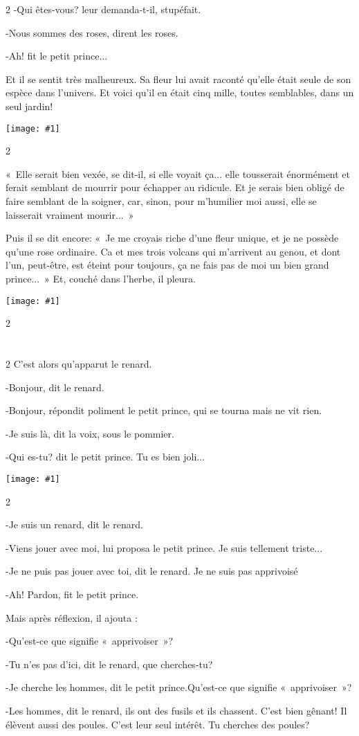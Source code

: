 \documentclass{report}
\newcommand{\parachapter}[2][]{\end{paracol}\chapter[#1]{#2}\begin{paracol}{2}}
\newcommand{\incpic}[1]{%
\end{paracol}
\begin{center}
    \texttt{[image: \#1]}
\end{center}
\begin{paracol}{2}}
\begin{document}
\begin{paracol}{2}
-Qui êtes-vous? leur demanda-t-il, stupéfait.

-Nous sommes des roses, dirent les roses.

-Ah! fit le petit prince...

Et il se sentit très malheureux. Sa fleur lui avait raconté qu'elle était seule de son espèce dans l'univers. Et voici qu'il en était cinq mille, toutes semblables, dans un seul jardin!

\incpic{pic/image36.jpeg}

«~Elle serait bien vexée, se dit-il, si elle voyait ça... elle tousserait énormément et ferait semblant de mourrir pour échapper au ridicule. Et je serais bien obligé de faire semblant de la soigner, car, sinon, pour m'humilier moi aussi, elle se laisserait vraiment mourir...~»

Puis il se dit encore: «~Je me croyais riche d'une fleur unique, et je ne possède qu'une rose ordinaire. Ca et mes trois volcans qui m'arrivent au genou, et dont l'un, peut-être, est éteint pour toujours, ça ne fais pas de moi un bien grand prince...~» Et, couché dans l'herbe, il pleura. 

\incpic{pic/image37.jpeg}

\parachapter{} %
C'est alors qu'apparut le renard.

-Bonjour, dit le renard.

-Bonjour, répondit poliment le petit prince, qui se tourna mais ne vit rien.

-Je suis là, dit la voix, sous le pommier.

-Qui es-tu? dit le petit prince. Tu es bien joli...

\incpic{pic/image38.jpeg}

-Je suis un renard, dit le renard.

-Viens jouer avec moi, lui proposa le petit prince. Je suis tellement triste...

-Je ne puis pas jouer avec toi, dit le renard. Je ne suis pas apprivoisé

-Ah! Pardon, fit le petit prince.

Mais après réflexion, il ajouta :

-Qu'est-ce que signifie «~apprivoiser~»?

-Tu n'es pas d'ici, dit le renard, que cherches-tu?

-Je cherche les hommes, dit le petit prince.Qu'est-ce que signifie «~apprivoiser~»?

-Les hommes, dit le renard, ils ont des fusils et ils chassent. C'est bien gênant! Il élèvent aussi des poules. C'est leur seul intérêt. Tu cherches des poules?


\end{paracol}
\end{document}
